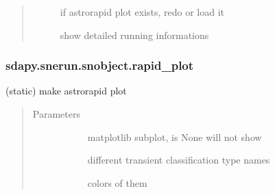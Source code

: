 \documentclass[letterpaper,10pt,english]{sphinxmanual}
\begin{document}
\begin{fulllineitems}
\begin{fulllineitems}
\begin{quote}
\begin{description}
\begin{description}
\item[{}] \leavevmode{[}\sphinxtitleref{bool}{]}
if astrorapid plot exists, re\sphinxhyphen{}do or load it

\item[{}] \leavevmode{[}\sphinxtitleref{bool}{]}
show detailed running informations

\end{description}

\end{description}\end{quote}

\end{fulllineitems}



\subsubsection{sdapy.snerun.snobject.rapid\_plot}
\label{\detokenize{generated/sdapy.snerun.snobject.rapid_plot:sdapy-snerun-snobject-rapid-plot}}\label{\detokenize{generated/sdapy.snerun.snobject.rapid_plot::doc}}

\begin{fulllineitems}
\label{\detokenize{generated/sdapy.snerun.snobject.rapid_plot:sdapy.snerun.snobject.rapid_plot}}
(static) make astrorapid plot
\begin{quote}\begin{description}
\item[{Parameters}] \leavevmode\begin{description}
\item[{}] \leavevmode{[}\sphinxtitleref{matplotlib.axes}{]}
matplotlib subplot, is None will not show

\item[{}] \leavevmode{[}\sphinxtitleref{list}{]}
different transient classification type names

\item[{}] \leavevmode{[}\sphinxtitleref{matplotlib.axes}{]}
colors of them


\end{description}
\end{description}
\end{quote}
\end{fulllineitems}
\end{fulllineitems}
\end{document}

